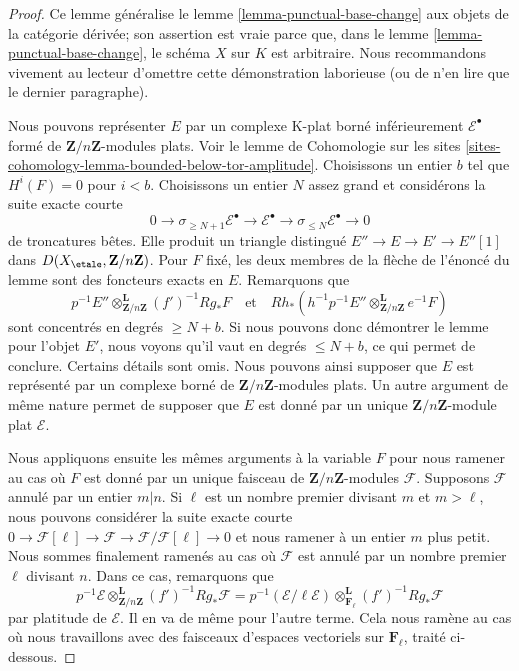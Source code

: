 \begin{proof}
Ce lemme généralise le lemme \ref{lemma-punctual-base-change}
aux objets de la catégorie dérivée; son assertion est vraie parce que,
dans le lemme \ref{lemma-punctual-base-change}, le schéma $X$ sur $K$
est arbitraire. Nous recommandons vivement au lecteur d'omettre cette démonstration laborieuse
(ou de n'en lire que le dernier paragraphe).

\medskip\noindent
Nous pouvons représenter $E$ par un complexe K-plat borné inférieurement
$\mathcal{E}^\bullet$ formé de $\mathbf{Z}/n\mathbf{Z}$-modules plats.
Voir le lemme de Cohomologie sur les sites
\ref{sites-cohomology-lemma-bounded-below-tor-amplitude}.
Choisissons un entier $b$ tel que $H^i(F) = 0$ pour $i < b$.
Choisissons un entier $N$ assez grand et considérons la suite exacte courte
$$
0 \to \sigma_{\geq N + 1}\mathcal{E}^\bullet \to
\mathcal{E}^\bullet \to
\sigma_{\leq N}\mathcal{E}^\bullet \to 0
$$
de troncatures bêtes. Elle produit un triangle distingué
$E'' \to E \to E' \to E''[1]$ dans $D(X_\etale, \mathbf{Z}/n\mathbf{Z})$.
Pour $F$ fixé, les deux membres de la flèche
de l'énoncé du lemme sont des foncteurs exacts en $E$. Remarquons que
$$
p^{-1}E'' \otimes_{\mathbf{Z}/n\mathbf{Z}}^\mathbf{L} (f')^{-1}Rg_*F
\quad\text{et}\quad
Rh_*(h^{-1}p^{-1}E'' \otimes_{\mathbf{Z}/n\mathbf{Z}}^\mathbf{L} e^{-1}F)
$$
sont concentrés en degrés $\geq N + b$. Si nous pouvons donc démontrer le lemme
pour l'objet $E'$, nous voyons qu'il vaut en degrés
$\leq N + b$, ce qui permet de conclure. Certains détails sont omis.
Nous pouvons ainsi supposer que $E$ est représenté
par un complexe borné de $\mathbf{Z}/n\mathbf{Z}$-modules plats.
Un autre argument de même nature permet de supposer
que $E$ est donné par un unique $\mathbf{Z}/n\mathbf{Z}$-module plat
$\mathcal{E}$.

\medskip\noindent
Nous appliquons ensuite les mêmes arguments à la variable $F$
pour nous ramener au cas où $F$ est donné par un unique
faisceau de $\mathbf{Z}/n\mathbf{Z}$-modules $\mathcal{F}$.
Supposons $\mathcal{F}$ annulé par un entier $m | n$.
Si $\ell$ est un nombre premier divisant $m$ et $m > \ell$,
nous pouvons considérer la suite exacte courte
$0 \to \mathcal{F}[\ell] \to \mathcal{F} \to
\mathcal{F}/\mathcal{F}[\ell] \to 0$
et nous ramener à un entier $m$ plus petit. Nous sommes finalement ramenés
au cas où $\mathcal{F}$ est annulé par un nombre
premier $\ell$ divisant $n$.
Dans ce cas, remarquons que
$$
p^{-1}\mathcal{E}
\otimes_{\mathbf{Z}/n\mathbf{Z}}^\mathbf{L}
(f')^{-1}Rg_*\mathcal{F}
=
p^{-1}(\mathcal{E}/\ell \mathcal{E})
\otimes_{\mathbf{F}_\ell}^\mathbf{L}
(f')^{-1}Rg_*\mathcal{F}
$$
par platitude de $\mathcal{E}$. Il en va de même pour l'autre terme.
Cela nous ramène au cas où nous travaillons avec des faisceaux
d'espaces vectoriels sur $\mathbf{F}_\ell$, traité ci-dessous.


\end{proof}
